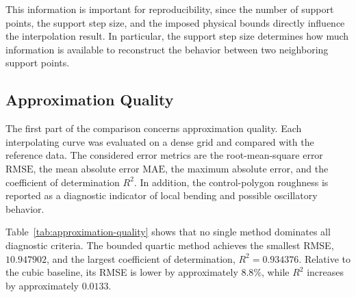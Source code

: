 \documentclass[12pt,a4paper]{article}
\begin{document}
This information is important for reproducibility, since the
number of support points, the support step size, and the imposed physical
bounds directly influence the interpolation result. In particular, the
support step size determines how much information is available to reconstruct
the behavior between two neighboring support points.

\subsection{Approximation Quality}

The first part of the comparison concerns approximation quality. Each
interpolating curve was evaluated on a dense grid and compared with the
reference data. The considered error metrics are the root-mean-square error
\(\mathrm{RMSE}\), the mean absolute error \(\mathrm{MAE}\), the maximum
absolute error, and the coefficient of determination \(R^2\). In addition,
the control-polygon roughness is reported as a diagnostic indicator of local
bending and possible oscillatory behavior.

\begin{table}[H]
\centering
\small
{}
\caption{Approximation quality and control-polygon roughness of the considered B\'ezier interpolation methods.}
\label{tab:approximation-quality}
\end{table}

Table~\ref{tab:approximation-quality} shows that no single method dominates
all diagnostic criteria. The bounded quartic method achieves the smallest
RMSE, \(10.947902\), and the largest coefficient of determination,
\(R^2=0.934376\). Relative to the cubic baseline, its RMSE is lower by
approximately \(8.8\%\), while \(R^2\) increases by approximately \(0.0133\).
\end{document}
